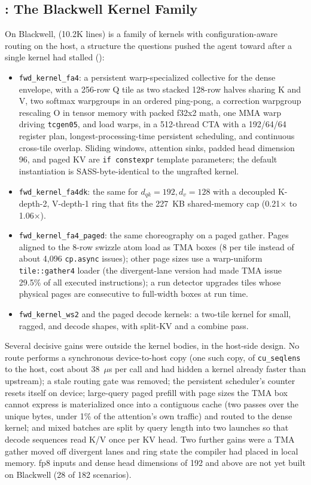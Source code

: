 \subsection{\ksFaFour: The Blackwell Kernel Family}
\label{kernelseek:sec:kernels-fa4}

On Blackwell, \ksFaFour (10.2K lines) is a family of kernels with configuration-aware routing on the
host, a structure the questions pushed the agent toward after a single kernel had stalled
():
\begin{itemize}[nosep,leftmargin=*]
\item \texttt{fwd\_kernel\_fa4}: a persistent warp-specialized collective for the dense envelope,
with a 256-row Q tile as two stacked 128-row halves sharing K and V, two softmax warpgroups in an
ordered ping-pong, a correction warpgroup rescaling O in tensor memory with packed f32x2 math, one
MMA warp driving \texttt{tcgen05}, and load warps, in a 512-thread CTA with a 192/64/64 register
plan, longest-processing-time persistent scheduling, and continuous cross-tile overlap. Sliding
windows, attention sinks, padded head dimension 96, and paged KV are \texttt{if constexpr} template
parameters; the default instantiation is SASS-byte-identical to the ungrafted kernel.
\item \texttt{fwd\_kernel\_fa4dk}: the same for $d_{qk}=192, d_v=128$ with a decoupled K-depth-2,
V-depth-1 ring that fits the 227~KB shared-memory cap (0.21$\times$ to 1.06$\times$).
\item \texttt{fwd\_kernel\_fa4\_paged}: the same choreography on a paged gather. Pages aligned to
the 8-row swizzle atom load as TMA boxes (8 per tile instead of about 4,096 \texttt{cp.async}
issues); other page sizes use a warp-uniform \texttt{tile::gather4} loader (the divergent-lane
version had made TMA issue 29.5\% of all executed instructions); a run detector upgrades tiles whose
physical pages are consecutive to full-width boxes at run time.
\item \texttt{fwd\_kernel\_ws2} and the paged decode kernels: a two-tile kernel for small, ragged,
and decode shapes, with split-KV and a combine pass.
\end{itemize}
Several decisive gains were outside the kernel bodies, in the host-side design. No route performs a
synchronous device-to-host copy (one such copy, of \texttt{cu\_seqlens} to the host, cost about
38~$\mu$s per call and had hidden a kernel already faster than upstream); a stale routing gate was
removed; the persistent scheduler's counter resets itself on device; large-query paged prefill with
page sizes the TMA box cannot express is materialized once into a contiguous cache (two passes over
the unique bytes, under 1\% of the attention's own traffic) and routed to the dense kernel; and
mixed batches are split by query length into two launches so that decode sequences read K/V once per
KV head. Two further gains were a TMA gather moved off divergent lanes and ring state the compiler
had placed in local memory. fp8 inputs and dense head dimensions of 192 and above are not yet built
on Blackwell (28 of 182 scenarios).

